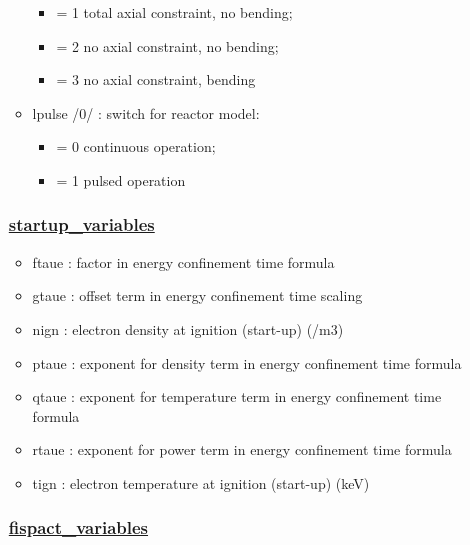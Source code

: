 \documentclass[]{article}
\providecommand{\tightlist}{%
  \setlength{\itemsep}{0pt}\setlength{\parskip}{0pt}}
\begin{document}
\begin{itemize}
\begin{itemize}
    \begin{itemize}
    \tightlist
    \item
      = 1 total axial constraint, no bending;
    \item
      = 2 no axial constraint, no bending;
    \item
      = 3 no axial constraint, bending
    \end{itemize}
  \item
    lpulse /0/ : switch for reactor model:

    \begin{itemize}
    \tightlist
    \item
      = 0 continuous operation;
    \item
      = 1 pulsed operation
    \end{itemize}
  \end{itemize}

  \subsubsection{\texorpdfstring{\href{startup_variables.html}{startup\_variables}}{startup\_variables}}\label{startup_variables}

  \begin{itemize}
  \tightlist
  \item
    ftaue : factor in energy confinement time formula
  \item
    gtaue : offset term in energy confinement time scaling
  \item
    nign : electron density at ignition (start-up) (/m3)
  \item
    ptaue : exponent for density term in energy confinement time formula
  \item
    qtaue : exponent for temperature term in energy confinement time
    formula
  \item
    rtaue : exponent for power term in energy confinement time formula
  \item
    tign : electron temperature at ignition (start-up) (keV)
  \end{itemize}

  \subsubsection{\texorpdfstring{\href{fispact_variables.html}{fispact\_variables}}{fispact\_variables}}\label{fispact_variables}


\end{itemize}
\end{document}
